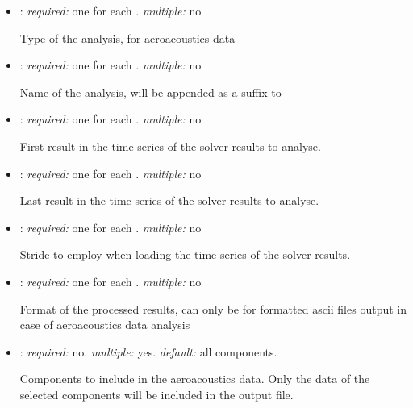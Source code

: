 \begin{itemize}
\item {}: \textit{required:} one for each . \textit{multiple:} no

Type of the analysis,  for aeroacoustics data

\item {}: \textit{required:} one for each . \textit{multiple:} no

Name of the analysis, will be appended as a suffix to 

\item {}: \textit{required:} one for each . \textit{multiple:} no

First result in the time series of the solver results to analyse.

\item {}: \textit{required:} one for each . \textit{multiple:} no

Last result in the time series of the solver results to analyse.

\item {}: \textit{required:} one for each . \textit{multiple:} no

Stride to employ when loading the time series of the solver results. 

\item {}: \textit{required:} one for each . \textit{multiple:} no

Format of the processed results, can only be  for formatted ascii files output in case of aeroacoustics data analysis

\item {}: \textit{required:} no. \textit{multiple:} yes. \textit{default:} all components.

Components to include in the aeroacoustics data. Only the data of the selected components will be included in the output file. 

\end{itemize}